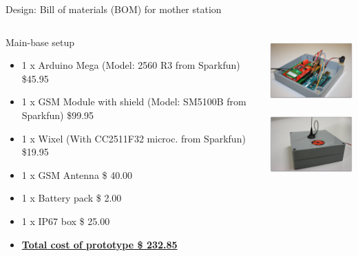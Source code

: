 \documentclass{beamer}
\begin{document}
\begin{frame}{Design: Bill of materials (BOM) for mother station}
\begin{columns}[T]
	\begin{column}[T]{6cm}
		Main-base setup
		\begin{itemize} \small
		\item 1 x Arduino Mega (Model: 2560 R3 from Sparkfun) \$45.95
		\item 1 x GSM Module with shield  (Model: SM5100B from Sparkfun) \$99.95
		\item 1 x Wixel   (With CC2511F32 microc. from Sparkfun) \$19.95
		\item 1 x GSM Antenna \$ 40.00
		\item 1 x Battery pack \$ 2.00
		\item 1 x IP67 box \$ 25.00
		\item \textbf{\underline{Total cost of prototype \$ 232.85}} 
		\end{itemize}
	\end{column}
		\begin{column}[T]{4cm}
		\includegraphics[height=2.7cm]{graphics/Field_pictures/Main_Open.JPG}\\
		\includegraphics[height=2.7cm]{graphics/Field_pictures/Main_Close.JPG}
		\end{column}
\end{columns}
\end{frame}
\end{document}
